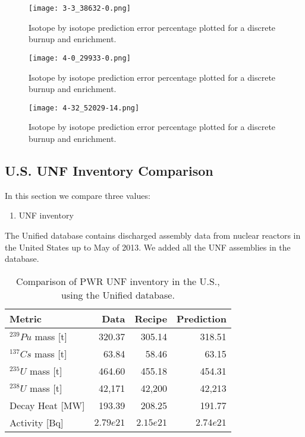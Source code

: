 \begin{figure}
    \centering
    \texttt{[image: 3-3\_38632-0.png]}
    \caption{Isotope by isotope prediction error percentage
             plotted for a discrete burnup and enrichment.
             }
    \label{fig:33_38632}
\end{figure}


\begin{figure}
    \centering
    \texttt{[image: 4-0\_29933-0.png]}
    \caption{Isotope by isotope prediction error percentage
             plotted for a discrete burnup and enrichment.
             }
    \label{fig:40_29933}
\end{figure}
    

\begin{figure}
    \centering
    \texttt{[image: 4-32\_52029-14.png]}
    \caption{Isotope by isotope prediction error percentage
             plotted for a discrete burnup and enrichment.}
    \label{fig:432_52029}
\end{figure}

\subsection{U.S. \gls{UNF} Inventory Comparison}

In this section we compare three values:
\begin{enumerate}
    \item \gls{UNF} inventory 
\end{enumerate}


The Unified database contains discharged assembly data
from nuclear reactors in the United States up to May of
2013. We added all the \gls{UNF} assemblies in the database.


\begin{table}[h]
    \centering
    \begin{tabular}{lrrr}
        \hline
        Metric & Data & Recipe & Prediction \\
        \hline
        $^{239}Pu$ mass [t] & 320.37 & 305.14 & 318.51\\
        $^{137}Cs$ mass [t] & 63.84 & 58.46 & 63.15 \\
        $^{235}U$ mass [t] & 464.60 & 455.18 & 454.31\\
        $^{238}U$ mass [t] & 42,171 & 42,200 & 42,213\\
        \hline
        Decay Heat [MW] & 193.39 & 208.25 & 191.77 \\
        Activity [Bq] & $2.79e21$ & $2.15e21$ & $2.74e21$ \\
        \hline
    \end{tabular}
    \caption{Comparison of \gls{PWR} \gls{UNF} inventory in the U.S.,
             using the Unified database.}
\end{table}


